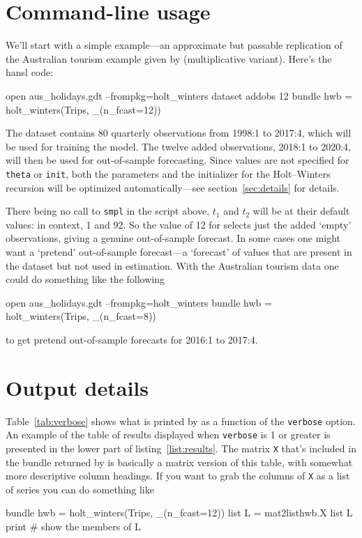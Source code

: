 \documentclass{article}
\begin{document}
\section{Command-line usage}
\label{sec:auto}

We'll start with a simple example---an approximate but passable
replication of the Australian tourism example given by
\cite{hyndman2021} (multiplicative variant). Here's the hansl
code:\label{pg:ex1}
\begin{nscode}
open aus_holidays.gdt --frompkg=holt_winters
dataset addobs 12
bundle hwb = holt_winters(Trips, _(n_fcast=12))
\end{nscode}

The  dataset contains 80 quarterly observations from
1998:1 to 2017:4, which will be used for training the model. The twelve
added observations, 2018:1 to 2020:4, will then be used for
out-of-sample forecasting. Since values are not specified for
\texttt{theta} or \texttt{init}, both the parameters and the initializer
for the Holt--Winters recursion will be optimized automatically---see
section~\ref{sec:details} for details.

There being no call to \texttt{smpl} in the script above, $t_1$ and
$t_2$ will be at their default values: in context, 1 and 92.  So the
value of 12 for  selects just the added `empty'
observations, giving a genuine out-of-sample forecast. In some cases one
might want a `pretend' out-of-sample forecast---a `forecast' of values
that are present in the dataset but not used in estimation. With the
Australian tourism data one could do something like the following
\begin{nscode}
open aus_holidays.gdt --frompkg=holt_winters
bundle hwb = holt_winters(Trips, _(n_fcast=8))
\end{nscode}
to get pretend out-of-sample forecasts for 2016:1 to 2017:4.

\section{Output details}
\label{sec:out}

Table~\ref{tab:verbose} shows what is printed by  as
a function of the \texttt{verbose} option. An example of the table of
results displayed when \texttt{verbose} is 1 or greater is presented
in the lower part of listing~\ref{list:results}. The matrix \texttt{X}
that's included in the bundle returned by  is
basically a matrix version of this table, with somewhat more
descriptive column headings. If you want to grab the columns of
\texttt{X} as a list of series you can do something like
\begin{nscode}
bundle hwb = holt_winters(Trips, _(n_fcast=12))
list L = mat2list{hwb.X}
list L print # show the members of L
\end{nscode}
\end{document}
